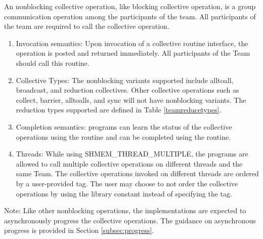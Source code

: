An \openshmem nonblocking collective operation, like blocking collective
operation, is a group communication operation among the
participants of the team. All participants of the team are required to call the
collective operation.

\begin{enumerate}

\item Invocation semantics: Upon invocation of a collective routine interface,
the operation is posted and returned immediately. All participants of the Team
should call this routine.

\item Collective Types: The nonblocking variants supported include alltoall,
broadcast, and reduction collectives. Other collective operations such as
collect, barrier, alltoalls, and sync will not have nonblocking variants. The
reduction types supported are defined in Table \ref{teamreducetypes}.

\item Completion semantics:  \openshmem programs can learn the status of the collective operations
using the  routine and can be completed using
the  routine.

\item Threads: While using SHMEM\_THREAD\_MULTIPLE, the \openshmem
programs are allowed to call multiple collective operations on different threads
and the same Team. The collective operations invoked on different threads
are ordered by a user-provided tag. The user may choose to not order the
collective operations by using the library constant
 instead of specifying the tag.

\end{enumerate}

Note: Like other nonblocking \openshmem operations, the implementations are
expected to asynchronously progress the collective operations. The guidance on
asynchronous progress is provided in Section \ref{subsec:progress}.



